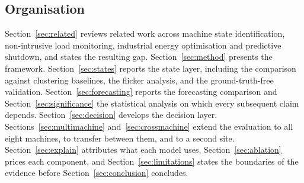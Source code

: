 \subsection*{Organisation}

Section~\ref{sec:related} reviews related work across machine state
identification, non-intrusive load monitoring, industrial energy
optimisation and predictive shutdown, and states the resulting gap.
Section~\ref{sec:method} presents the framework.
Section~\ref{sec:states} reports the state layer, including the
comparison against clustering baselines, the flicker analysis, and the
ground-truth-free validation. Section~\ref{sec:forecasting} reports the
forecasting comparison and Section~\ref{sec:significance} the
statistical analysis on which every subsequent claim depends.
Section~\ref{sec:decision} develops the decision layer.
Sections~\ref{sec:multimachine} and~\ref{sec:crossmachine} extend the
evaluation to all eight machines, to transfer between them, and to a
second site. Section~\ref{sec:explain} attributes what each model uses,
Section~\ref{sec:ablation} prices each component, and
Section~\ref{sec:limitations} states the boundaries of the evidence
before Section~\ref{sec:conclusion} concludes.
